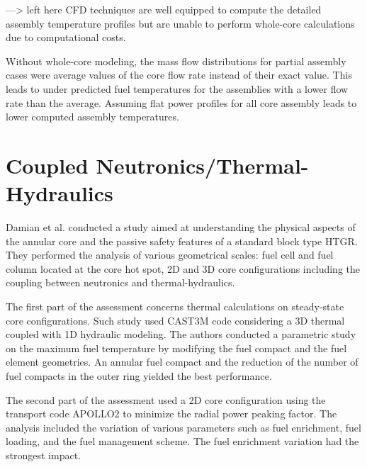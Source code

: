 \documentclass[11pt,letterpaper]{article}
\begin{document}
---> left here
CFD techniques are well equipped to compute the detailed assembly temperature profiles but are unable to perform whole-core calculations due to computational costs.

Without whole-core modeling, the mass flow distributions for partial assembly cases were average values of the core flow rate instead of their exact value.
This leads to under predicted fuel temperatures for the assemblies with a lower flow rate than the average.
Assuming flat power profiles for all core assembly leads to lower computed assembly temperatures.




\section{Coupled Neutronics/Thermal-Hydraulics}

Damian et al. \cite{damian_vhtr_2008} conducted a study aimed at understanding the physical aspects of the annular core and the passive safety features of a standard block type \gls{HTGR}.
They performed the analysis of various geometrical scales: fuel cell and fuel column located at the core hot spot, 2D and 3D core configurations including the coupling between neutronics and thermal-hydraulics.

The first part of the assessment concerns thermal calculations on steady-state core configurations.
Such study used CAST3M \cite{studer_cast3marcturus_2007} code considering a 3D thermal coupled with 1D hydraulic modeling.
The authors conducted a parametric study on the maximum fuel temperature by modifying the fuel compact and the fuel element geometries.
An annular fuel compact and the reduction of the number of fuel compacts in the outer ring yielded the best performance.

The second part of the assessment used a 2D core configuration using the transport code APOLLO2 \cite{sanchez_apollo2_1999} to minimize the radial power peaking factor.
The analysis included the variation of various parameters such as fuel enrichment, fuel loading, and the fuel management scheme.
The fuel enrichment variation had the strongest impact.
\end{document}
